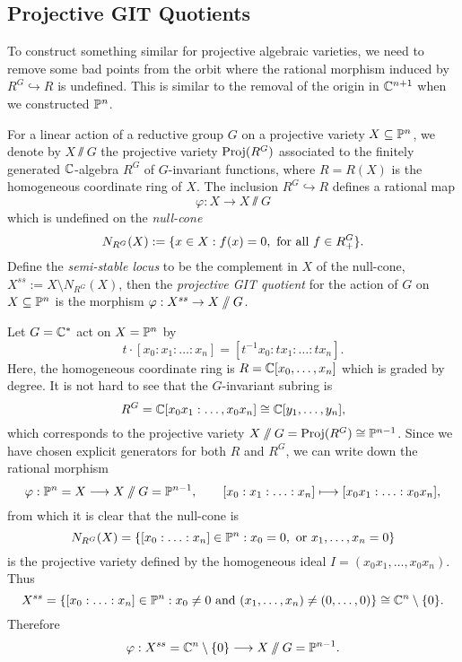 \subsection{Projective GIT Quotients}

To construct something similar for projective algebraic varieties, we need to remove some bad points from the orbit where the rational morphism induced by $R^{G} \hookrightarrow R$ is undefined. This is similar to the removal of the origin in $\mathbb{C}^{n+1}$ when we constructed $\mathbb{P}^{n}$.

\begin{defn}
	For a linear action of a reductive group $G$ on a projective variety $X \subseteq \mathbb{P}^{n}$, we denote by $X \sslash G$ the projective variety $\operatorname{Proj}(R^{G})$ associated to the finitely generated $\mathbb{C}$-algebra $R^{G}$ of $G$-invariant functions, where $R = R(X)$ is the homogeneous coordinate ring of $X$. The inclusion $R^{G} \hookrightarrow R$ defines a rational map
	$$
		\varphi : X \rightarrow X \sslash G
	$$
	which is undefined on the \emph{null-cone}
	$$
		N_{R^{G}}(X) := \{ x \in X : f(x) = 0, \text{ for all } f \in R_{+}^{G} \}.
	$$
	Define the \emph{semi-stable locus} to be the complement in $X$ of the null-cone, $X^{ss} := X \setminus N_{R^{G}}(X)$, then the \emph{projective GIT quotient} for the action of $G$ on $X \subseteq \mathbb{P}^{n}$ is the morphism $\varphi: X^{ss} \rightarrow X\sslash G$.
\end{defn}

\begin{ex}
	Let $G = \mathbb{C}^{\ast}$ act on $X = \mathbb{P}^{n}$ by
	$$
		t \cdot [x_{0}: x_{1}: \ldots : x_{n}] = [t^{-1}x_{0}: tx_{1}: \ldots : tx_{n}].
	$$
	Here, the homogeneous coordinate ring is $R = \mathbb{C}[x_{0},\ldots, x_{n}]$ which is graded by degree. It is not hard to see that the $G$-invariant subring is 
	$$
		R^{G} = \mathbb{C}[x_{0}x_{1}:\ldots, x_{0}x_{n}] \cong \mathbb{C}[y_{1},\ldots, y_{n}],
	$$ which corresponds to the projective variety $X \sslash G  = \operatorname{Proj}(R^{G}) \cong \mathbb{P}^{n-1}$. Since we have chosen explicit generators for both $R$ and $R^{G}$, we can write down the rational morphism
	$$
		\varphi: \mathbb{P}^{n} = X \longrightarrow X \sslash G = \mathbb{P}^{n-1},\qquad [x_{0}: x_{1}: \ldots : x_{n}] \longmapsto [x_{0}x_{1} : \ldots : x_{0}x_{n} ],
	$$
	from which it is clear that the null-cone is
	$$
		N_{R^{G}}(X) = \{ [x_{0}:\ldots : x_{n}] \in \mathbb{P}^{n} : x_{0} = 0, \text{ or } x_{1}, \ldots, x_{n} = 0   \}
	$$
	is the projective variety defined by the homogeneous ideal $I = (x_{0}x_{1}, \ldots, x_{0}x_{n})$. Thus
	$$
		X^{ss} = \{ [x_{0}: \ldots : x_{n}] \in \mathbb{P}^{n} : x_{0} \neq 0 \text{ and } (x_{1},\ldots, x_{n}) \neq (0,\ldots,0) \} \cong \mathbb{C}^{n} \setminus \{0\}.
	$$
	Therefore
	$$
		\varphi: X^{ss} = \mathbb{C}^{n} \setminus \{0\} \longrightarrow X \sslash G = \mathbb{P}^{n-1}.
	$$
\end{ex}













